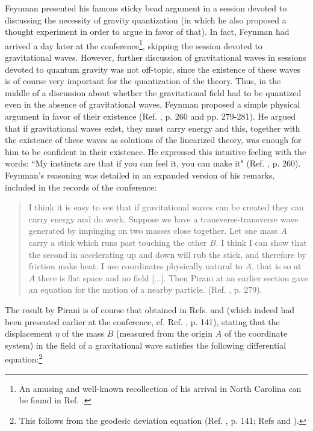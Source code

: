 \documentclass{ws-procs961x669}            %
\begin{document}
Feynman presented his famous sticky bead argument in a session
devoted to discussing the necessity of gravity quantization (in
which he also proposed a thought experiment in order to argue in
favor of that). In fact, Feynman had arrived a day later at the
conference\footnote{An amusing and well-known recollection of his
arrival in North Carolina can be found in Ref.
.}, skipping the session devoted to
gravitational waves. However, further discussion of gravitational
waves in sessions devoted to quantum gravity was not off-topic,
since the existence of these waves is of course very important for
the quantization of the theory. Thus, in the middle of a
discussion about whether the gravitational field had to be
quantized even in the absence of gravitational waves, Feynman
proposed a simple physical argument in favor of their existence
(Ref. , p. 260 and pp. 279-281). He argued
that if gravitational waves exist, they must carry energy and
this, together with the existence of these waves as solutions of
the linearized theory, was enough for him to be confident in their
existence. He expressed this intuitive feeling with the words:
``My instincts are that if you can feel it, you can make it" (Ref.
, p. 260). Feynman's reasoning was detailed in
an expanded version of his remarks, included in the records of the
conference\cite{ChapelHill}:
\begin{quote}
I think it is easy to see that if gravitational waves can be
created they can carry energy and do work. Suppose we have a
transverse-transverse wave generated by impinging on two masses
close together. Let one mass $A$ carry a stick which runs past
touching the other $B$. I think I can show that the second in
accelerating up and down will rub the stick, and therefore by
friction make heat. I use coordinates physically natural to $A$,
that is so at $A$ there is flat space and no field [...]. Then
Pirani at an earlier section gave an equation for the motion of a
nearby particle. (Ref. , p. 279).
\end{quote}
The result by Pirani is of course that obtained in Refs.
 and  (which indeed had been
presented earlier at the conference, cf. Ref.
, p. 141), stating that the displacement
$\eta$ of the mass $B$ (measured from the origin $A$ of the
coordinate system) in the field of a gravitational wave satisfies
the following differential equation:\footnote{This follows from
the geodesic deviation equation (Ref. , p.
141; Refs  and ).}
\end{document}
